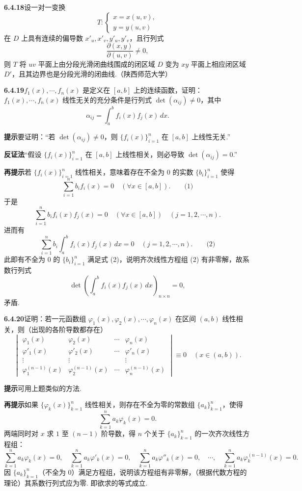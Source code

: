 \documentclass[UTF8, 12pt, fontset=fandol, oneside]{ctexart}
\begin{document}
\noindent\textbf{6.4.18}\quad 设一对一变换
\[
T:
\begin{cases}
  x=x(u,v),\\
  y=y(u,v)
\end{cases}
\]
在 $D$ 上具有连续的偏导数 $x'_u,x'_v,y'_u,y'_v$，且行列式
\[
  \frac{\partial(x,y)}{\partial(u,v)}\ne0,
\]
则 $T$ 将 $uv$ 平面上由分段光滑闭曲线围成的闭区域 $D$ 变为 $xy$ 平面上相应闭区域 $D'$，且其边界也是分段光滑的闭曲线.（陕西师范大学）

\noindent\textbf{6.4.19}\quad $f_1(x),\cdots,f_n(x)$ 是定义在 $[a,b]$ 上的连续函数，证明：$f_1(x),\cdots,f_n(x)$ 线性无关的充分条件是行列式
$\det(\alpha_{ij})\ne0$，其中
\[
  \alpha_{ij}=\int_a^b f_i(x)f_j(x)\,dx.
\]

\noindent\textbf{提示}\quad 要证明：“若 $\det(\alpha_{ij})\ne0$，则 $\{f_i(x)\}_{i=1}^n$ 在 $[a,b]$ 上线性无关.”

\noindent\textbf{反证法}\quad “假设 $\{f_i(x)\}_{i=1}^n$ 在 $[a,b]$ 上线性相关，则必导致 $\det(\alpha_{ij})=0$.”

\noindent\textbf{再提示}\quad 若 $\{f_i(x)\}_{i=1}^n$ 线性相关，意味着存在不全为 $0$ 的实数 $\{b_i\}_{i=1}^n$ 使得
\[
  \sum_{i=1}^n b_i f_i(x)=0\quad(\forall x\in[a,b]). \qquad\text{(1)}
\]
于是
\[
  \sum_{i=1}^n b_i f_i(x)f_j(x)=0\quad(\forall x\in[a,b])\quad(j=1,2,\cdots,n).
\]
进而有
\[
  \sum_{i=1}^n b_i\int_a^b f_i(x)f_j(x)\,dx=0
  \quad(j=1,2,\cdots,n). \qquad\text{(2)}
\]
此即有不全为 $0$ 的 $\{b_i\}_{i=1}^n$ 满足式 (2)，说明齐次线性方程组 (2) 有非零解，故系数行列式
\[
  \det\left(\int_a^b f_i(x)f_j(x)\,dx\right)_{n\times n}=0,
\]
矛盾.

\noindent\textbf{6.4.20}\quad 证明：若一元函数组
$\varphi_1(x),\varphi_2(x),\cdots,\varphi_n(x)$ 在区间 $(a,b)$ 线性相关，则（出现的各阶导数都存在）
\[
\begin{vmatrix}
  \varphi_1(x)&\varphi_2(x)&\cdots&\varphi_n(x)\\
  \varphi'_1(x)&\varphi'_2(x)&\cdots&\varphi'_n(x)\\
  \vdots&\vdots&&\vdots\\
  \varphi_1^{(n-1)}(x)&\varphi_2^{(n-1)}(x)&\cdots&\varphi_n^{(n-1)}(x)
\end{vmatrix}
\equiv0\quad(x\in(a,b)).
\]

\noindent\textbf{提示}\quad 可用上题类似的方法.

\noindent\textbf{再提示}\quad 如果 $\{\varphi_k(x)\}_{k=1}^n$ 线性相关，则存在不全为零的常数组
$\{a_k\}_{k=1}^n$，使得
\[
  \sum_{k=1}^n a_k\varphi_k(x)=0.
\]
两端同时对 $x$ 求 $1$ 至 $(n-1)$ 阶导数，得 $n$ 个关于 $\{a_k\}_{k=1}^n$ 的一次齐次线性方程组：
\[
  \sum_{k=1}^n a_k\varphi_k(x)=0,\quad
  \sum_{k=1}^n a_k\varphi'_k(x)=0,\quad
  \sum_{k=1}^n a_k\varphi''_k(x)=0,\quad\cdots,\quad
  \sum_{k=1}^n a_k\varphi_k^{(n-1)}(x)=0.
\]
因 $\{a_k\}_{k=1}^n$（不全为 $0$）满足方程组，说明该方程组有非零解，（根据代数方程的理论）其系数行列式应为零. 即欲求的等式成立.
\end{document}
